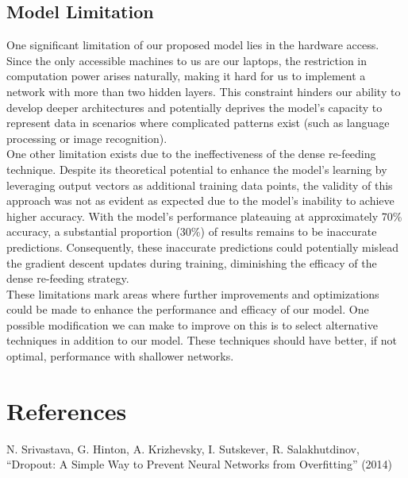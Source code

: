 \documentclass{article}
\begin{document}
\subsection{Model Limitation}
One significant limitation of our proposed model lies in the hardware access. Since the only accessible machines to us are our laptops, the restriction in computation power arises naturally, making it hard for us to implement a network with more than two hidden layers. This constraint hinders our ability to develop deeper architectures and potentially deprives the model's capacity to represent data in scenarios where complicated patterns exist (such as language processing or image recognition).\\

\noindent One other limitation exists due to the ineffectiveness of the dense re-feeding technique. Despite its theoretical potential to enhance the model's learning by leveraging output vectors as additional training data points, the validity of this approach was not as evident as expected due to the model's inability to achieve higher accuracy. With the model's performance plateauing at approximately 70\% accuracy, a substantial proportion (30\%) of results remains to be inaccurate predictions. Consequently, these inaccurate predictions could potentially mislead the gradient descent updates during training, diminishing the efficacy of the dense re-feeding strategy.\\

\noindent These limitations mark areas where further improvements and optimizations could be made to enhance the performance and efficacy of our model. One possible modification we can make to improve on this is to select alternative techniques in addition to our model. These techniques should have better, if not optimal, performance with shallower networks. 

\section{References}
N. Srivastava, G. Hinton, A. Krizhevsky, I. Sutskever, R. Salakhutdinov, “Dropout: A Simple Way to Prevent Neural Networks from Overfitting” (2014)
\end{document}
